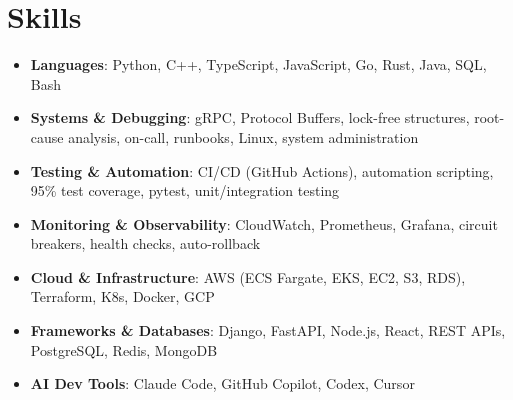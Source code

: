 \documentclass[letterpaper,11pt]{article}
\newcommand{\resumeSubHeadingListStart}{\begin{itemize}[leftmargin=0.15in, label={}]}
\newcommand{\resumeSubHeadingListEnd}{\end{itemize}}
\newcommand{\resumeSkillHeading}[2]{%
  \item\small{\textbf{#1}: #2 \vspace{-9pt}}%
}
\begin{document}
\section{Skills}
  \resumeSubHeadingListStart
    \resumeSkillHeading{Languages}{Python, C++, TypeScript, JavaScript, Go, Rust, Java, SQL, Bash}
    \resumeSkillHeading{Systems \& Debugging}{gRPC, Protocol Buffers, lock-free structures, root-cause analysis, on-call, runbooks, Linux, system administration}
    \resumeSkillHeading{Testing \& Automation}{CI/CD (GitHub Actions), automation scripting, 95\% test coverage, pytest, unit/integration testing}
    \resumeSkillHeading{Monitoring \& Observability}{CloudWatch, Prometheus, Grafana, circuit breakers, health checks, auto-rollback}
    \resumeSkillHeading{Cloud \& Infrastructure}{AWS (ECS Fargate, EKS, EC2, S3, RDS), Terraform, K8s, Docker, GCP}
    \resumeSkillHeading{Frameworks \& Databases}{Django, FastAPI, Node.js, React, REST APIs, PostgreSQL, Redis, MongoDB}
    \resumeSkillHeading{AI Dev Tools}{Claude Code, GitHub Copilot, Codex, Cursor}
  \resumeSubHeadingListEnd
\end{document}
